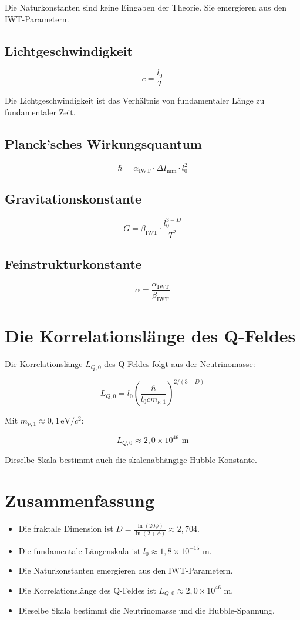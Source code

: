 Die Naturkonstanten sind keine Eingaben der Theorie. Sie emergieren aus den IWT-Parametern.

\subsection{Lichtgeschwindigkeit}

\[
c = \frac{l_0}{T}
\]

Die Lichtgeschwindigkeit ist das Verhältnis von fundamentaler Länge zu fundamentaler Zeit.

\subsection{Planck'sches Wirkungsquantum}

\[
\hbar = \alpha_{\text{IWT}} \cdot \Delta I_{\text{min}} \cdot l_0^2
\]

\subsection{Gravitationskonstante}

\[
G = \beta_{\text{IWT}} \cdot \frac{l_0^{3-D}}{T^2}
\]

\subsection{Feinstrukturkonstante}

\[
\alpha = \frac{\alpha_{\text{IWT}}}{\beta_{\text{IWT}}}
\]

\section{Die Korrelationslänge des Q-Feldes}

Die Korrelationslänge \( L_{Q,0} \) des Q-Feldes folgt aus der Neutrinomasse:

\[
L_{Q,0} = l_0 \left( \frac{\hbar}{l_0 c m_{\nu,1}} \right)^{2/(3-D)}
\]

Mit \( m_{\nu,1} \approx 0,1 \, \text{eV}/c^2 \):

\[
L_{Q,0} \approx 2,0 \times 10^{46} \text{ m}
\]

Dieselbe Skala bestimmt auch die skalenabhängige Hubble-Konstante.

\section{Zusammenfassung}

\begin{itemize}
\item Die fraktale Dimension ist \( D = \frac{\ln(20\phi)}{\ln(2+\phi)} \approx 2,704 \).
\item Die fundamentale Längenskala ist \( l_0 \approx 1,8 \times 10^{-15} \) m.
\item Die Naturkonstanten emergieren aus den IWT-Parametern.
\item Die Korrelationslänge des Q-Feldes ist \( L_{Q,0} \approx 2,0 \times 10^{46} \) m.
\item Dieselbe Skala bestimmt die Neutrinomasse und die Hubble-Spannung.
\end{itemize}